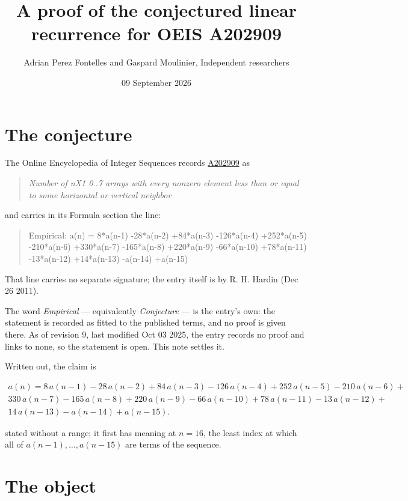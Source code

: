 \documentclass[11pt]{article}
\title{A proof of the conjectured linear recurrence for OEIS A202909}
\author{Adrian Perez Fontelles and Gaspard Moulinier, Independent researchers}
\date{09 September 2026}
\theoremstyle{definition}
\begin{document}
\maketitle
\section{The conjecture}

The Online Encyclopedia of Integer Sequences records \href{https://oeis.org/A202909}{A202909} as

\begin{quote}\itshape Number of nX1 0..7 arrays with every nonzero element less than or equal to some horizontal or vertical neighbor\end{quote}

and carries in its Formula section the line:

\begin{quote}\ttfamily Empirical: a(n) = 8*a(n-1) -28*a(n-2) +84*a(n-3) -126*a(n-4) +252*a(n-5) -210*a(n-6) +330*a(n-7) -165*a(n-8) +220*a(n-9) -66*a(n-10) +78*a(n-11) -13*a(n-12) +14*a(n-13) -a(n-14) +a(n-15)\end{quote}

That line carries no separate signature; the entry itself is by R. H. Hardin (Dec 26 2011).

The word {\itshape Empirical} --- equivalently {\itshape Conjecture} --- is the entry's own: the statement is recorded as fitted to the published terms, and no proof is given there. As of revision 9, last modified Oct 03 2025, the entry records no proof and links to none, so the statement is open. This note settles it.

Written out, the claim is

\begin{multline*} a(n) = 8\,a(n-1) - 28\,a(n-2) + 84\,a(n-3) - 126\,a(n-4) + 252\,a(n-5) - 210\,a(n-6) + \\ 330\,a(n-7) - 165\,a(n-8) + 220\,a(n-9) - 66\,a(n-10) + 78\,a(n-11) - 13\,a(n-12) + \\ 14\,a(n-13) - a(n-14) + a(n-15). \end{multline*}

stated without a range; it first has meaning at $n = 16$, the least index at which all of $a(n-1),\dots,a(n-15)$ are terms of the sequence.

\section{The object}
\end{document}
